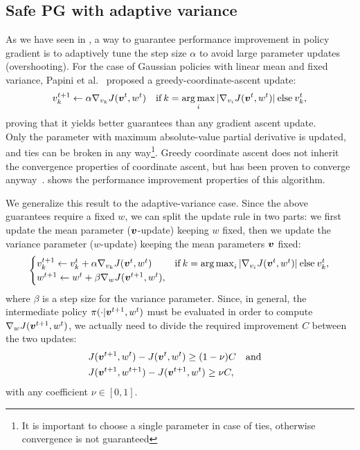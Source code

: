 \subsection{Safe PG with adaptive variance}\label{sec:safe+explore}
As we have seen in , a way to guarantee performance improvement in policy gradient is to adaptively tune the step size $\alpha$  to avoid large parameter updates (overshooting). For the case of Gaussian policies with linear mean and fixed variance, Papini et al.~\cite{adaptive_batch} proposed a greedy-coordinate-ascent update:
\begin{align}\label{up:onlyv}
v_{k}^{t+1} \gets \alpha\gradJ[v_{k}]{\vv^t,w^t}
\quad \text{if}\:k =  \argmax_i |\gradJ[v_i]{\vv^t, w^t}| \:\text{else}\:v_{k}^t,
\end{align}
proving that it yields better guarantees than any gradient ascent update.\\
Only the parameter with maximum absolute-value partial derivative is updated, and ties can be broken in any way\footnote{It is important to choose a single parameter in case of ties, otherwise convergence is not guaranteed}. Greedy coordinate ascent does not inherit the convergence properties of coordinate ascent, but has been proven to converge anyway~\cite{nutinicoordinate}.  shows the performance improvement properties of this algorithm.


We generalize this result to the adaptive-variance case. Since the above guarantees require a fixed $w$, we can split the update rule in two parts: we first update the mean parameter ($\vv$-update) keeping $w$ fixed, then we update the variance parameter ($w$-update) keeping the mean parameters $\vv$ fixed:
%
\begin{align}\label{eq:naive_update}
\begin{cases}
v_{k}^{t+1} \gets v_{k}^t + \alpha\gradJ[v_{k}]{\vv^t,w^t}
	& \text{if}\:k =  \argmax_i |\gradJ[v_i]{\vv^t, w^t}| \:\text{else}\:v_{k}^t,\\
w^{t+1} \gets w^t + \beta\gradJ[w]{\vv^{t+1}, w^t},
\end{cases}
\end{align}
%
where $\beta$ is a step size for the variance parameter.
Since, in general, the intermediate policy $\pi(\cdot\vert\vv^{t+1},w^t)$ must be evaluated in order to compute $\gradJ[w]{\vv^{t+1},w^t}$, we actually need to divide the required improvement $C$ between the two updates:
%
\begin{align}%
&J(\vv^{t+1},w^t) - J(\vv^t,w^t) \geq (1-\nu) C \quad \text{and}\quad \label{eq:update-first} \\ 
&J(\vv^{t+1},w^{t+1}) - J(\vv^{t+1},w^t) \geq \nu C, \label{eq:update-second}
\end{align}
with any coefficient $\nu \in [0,1]$.

